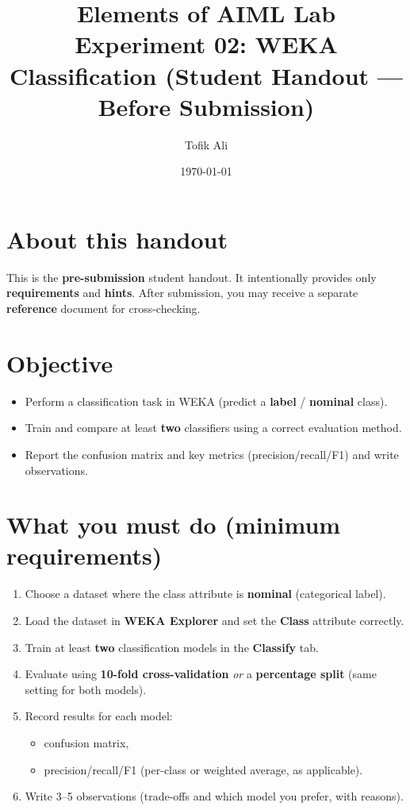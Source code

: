 \documentclass[11pt]{article}
\title{Elements of AIML Lab\\Experiment 02: WEKA Classification (Student Handout — Before Submission)}
\author{Tofik Ali}
\date{\today}
\begin{document}
\maketitle
\tableofcontents

\section{About this handout}
This is the \textbf{pre-submission} student handout.
It intentionally provides only \textbf{requirements} and \textbf{hints}.
After submission, you may receive a separate \textbf{reference} document for cross-checking.

\section{Objective}
\begin{itemize}[leftmargin=*]
  \item Perform a classification task in WEKA (predict a \textbf{label} / \textbf{nominal} class).
  \item Train and compare at least \textbf{two} classifiers using a correct evaluation method.
  \item Report the confusion matrix and key metrics (precision/recall/F1) and write observations.
\end{itemize}

\section{What you must do (minimum requirements)}
\begin{enumerate}[leftmargin=*]
  \item Choose a dataset where the class attribute is \textbf{nominal} (categorical label).
  \item Load the dataset in \textbf{WEKA Explorer} and set the \textbf{Class} attribute correctly.
  \item Train at least \textbf{two} classification models in the \textbf{Classify} tab.
  \item Evaluate using \textbf{10-fold cross-validation} \emph{or} a \textbf{percentage split} (same setting for both models).
  \item Record results for each model:
  \begin{itemize}[leftmargin=*]
    \item confusion matrix,
    \item precision/recall/F1 (per-class or weighted average, as applicable).
  \end{itemize}
  \item Write 3--5 observations (trade-offs and which model you prefer, with reasons).
\end{enumerate}
\end{document}
